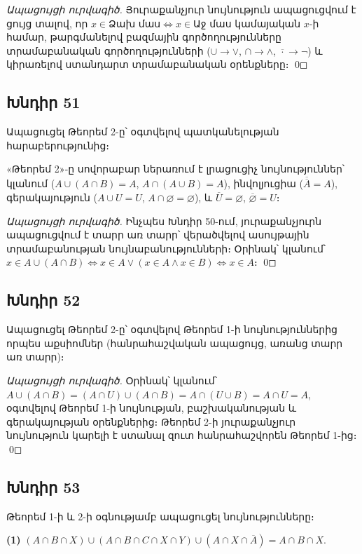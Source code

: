 \textit{Ապացույցի ուրվագիծ.} Յուրաքանչյուր նույնություն ապացուցվում է ցույց տալով, որ $x \in \text{Ձախ մաս} \iff x \in \text{Աջ մաս}$ կամայական $x$-ի համար, թարգմանելով բազմային գործողությունները տրամաբանական գործողությունների ($\cup \to \lor$, $\cap \to \land$, $\overline{\cdot} \to \lnot$) և կիրառելով ստանդարտ տրամաբանական օրենքները։ \qed

\subsection*{Խնդիր 51}
Ապացուցել Թեորեմ 2-ը՝ օգտվելով պատկանելության հարաբերությունից։

«Թեորեմ 2»-ը սովորաբար ներառում է լրացուցիչ նույնություններ՝ կլանում ($A \cup (A \cap B) = A$, $A \cap (A \cup B) = A$), ինվոլյուցիա ($\overline{\overline{A}} = A$), գերակայություն ($A \cup U = U$, $A \cap \varnothing = \varnothing$), և $\overline{U} = \varnothing$, $\overline{\varnothing} = U$։

\textit{Ապացույցի ուրվագիծ.} Ինչպես Խնդիր 50-ում, յուրաքանչյուրն ապացուցվում է տարր առ տարր՝ վերածվելով ասույթային տրամաբանության նույնաբանությունների։ Օրինակ՝ կլանում՝ $x \in A \cup (A \cap B) \iff x \in A \lor (x \in A \land x \in B) \iff x \in A$։ \qed

\subsection*{Խնդիր 52}
Ապացուցել Թեորեմ 2-ը՝ օգտվելով Թեորեմ 1-ի նույնություններից որպես աքսիոմներ (հանրահաշվական ապացույց, առանց տարր առ տարր)։

\textit{Ապացույցի ուրվագիծ.} Օրինակ՝ կլանում՝ $A \cup (A \cap B) = (A \cap U) \cup (A \cap B) = A \cap (U \cup B) = A \cap U = A$, օգտվելով Թեորեմ 1-ի նույնության, բաշխականության և գերակայության օրենքներից։ Թեորեմ 2-ի յուրաքանչյուր նույնություն կարելի է ստանալ զուտ հանրահաշվորեն Թեորեմ 1-ից։ \qed

\subsection*{Խնդիր 53}
Թեորեմ 1-ի և 2-ի օգնությամբ ապացուցել նույնությունները։

\textbf{(1)} $(A \cap B \cap X) \cup (A \cap B \cap C \cap X \cap Y) \cup (A \cap X \cap \overline{A}) = A \cap B \cap X$.

